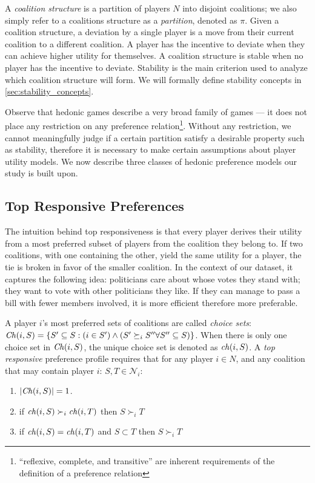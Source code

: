 A \textit{coalition structure} is a partition of players $N$ into disjoint
coalitions;
we also simply refer to a coalitions structure as a \textit{partition},
denoted as $\pi$.
Given a coalition structure, a deviation by a single player is a
move from their current coalition to a different coalition.
A player has the incentive to deviate when they can achieve higher utility for
themselves.
A coalition structure is stable when no player has the incentive to deviate.
Stability is the main criterion used to analyze which coalition structure will
form.
We will formally define stability concepts in \autoref{sec:stability_concepts}.

Observe that hedonic games describe a very broad family of games --- it does not
place any restriction on any preference relation\footnote{``reflexive, complete,
and transitive'' are inherent requirements of the definition of a preference
relation}.
Without any restriction, we cannot meaningfully judge if a certain partition
satisfy a desirable property such as stability, therefore it is necessary to make
certain assumptions about player utility models.
We now describe three classes of hedonic preference models our study is built upon.

\subsection{Top Responsive Preferences}
\label{subsec:top_responsive_preferences}
The intuition behind top responsiveness is that every player derives their
utility from a most preferred subset of players from the coalition they belong to.
If two coalitions, with one containing the other, yield the same utility for
a player, the tie is broken in favor of the smaller coalition.
In the context of our dataset, it captures the following idea:
politicians care about whose votes they stand with;
they want to vote with other politicians they like.
If they can manage to pass a bill with fewer members involved,
it is more efficient therefore more preferable.

A player $i$'s most preferred sets of coalitions are called \textit{choice sets}:
$\mathit{Ch}(i, S) = \{S' \subseteq S: (i \in S') \wedge (S' \succeq_i S'' \forall S'' \subseteq S)\}$.
When there is only one choice set in $\mathit{Ch}(i, S)$, the unique choice set is
denoted as $\mathit{ch}(i, S)$.
A {\em top responsive} preference profile requires that for any player $i \in N$,
and any coalition that may contain player $i$: $S, T \in \mathcal{N}_i$:
\begin{enumerate}
  \item $|\mathit{Ch}(i, S)| = 1$.
  \item if $\mathit{ch}(i, S) \succ_i \mathit{ch}(i, T)$ then $S \succ_i T$
  \item if $\mathit{ch}(i, S) = \mathit{ch}(i, T)$ and $S \subset T$ then $S \succ_i T$
\end{enumerate}

